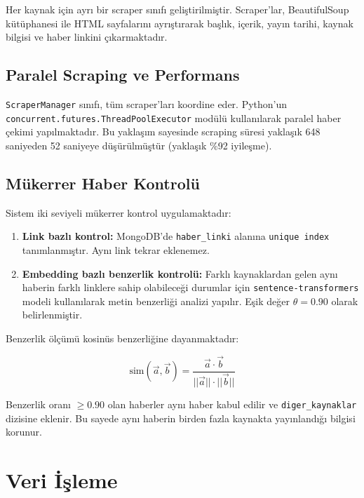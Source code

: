 \documentclass[conference]{IEEEtran}
\begin{document}
Her kaynak için ayrı bir scraper sınıfı geliştirilmiştir. Scraper'lar, BeautifulSoup kütüphanesi ile HTML sayfalarını ayrıştırarak başlık, içerik, yayın tarihi, kaynak bilgisi ve haber linkini çıkarmaktadır.

\subsection{Paralel Scraping ve Performans}

\texttt{ScraperManager} sınıfı, tüm scraper'ları koordine eder. Python'un \texttt{concurrent.futures.ThreadPoolExecutor} modülü kullanılarak paralel haber çekimi yapılmaktadır. Bu yaklaşım sayesinde scraping süresi yaklaşık 648 saniyeden 52 saniyeye düşürülmüştür (yaklaşık \%92 iyileşme).

\subsection{Mükerrer Haber Kontrolü}

Sistem iki seviyeli mükerrer kontrol uygulamaktadır:

\begin{enumerate}
    \item \textbf{Link bazlı kontrol:} MongoDB'de \texttt{haber\_linki} alanına \texttt{unique index} tanımlanmıştır. Aynı link tekrar eklenemez.
    \item \textbf{Embedding bazlı benzerlik kontrolü:} Farklı kaynaklardan gelen aynı haberin farklı linklere sahip olabileceği durumlar için \texttt{sentence-transformers} modeli kullanılarak metin benzerliği analizi yapılır. Eşik değer $\theta = 0.90$ olarak belirlenmiştir.
\end{enumerate}

Benzerlik ölçümü kosinüs benzerliğine dayanmaktadır:

\begin{equation}
    \text{sim}(\vec{a}, \vec{b}) = \frac{\vec{a} \cdot \vec{b}}{||\vec{a}|| \cdot ||\vec{b}||}
\end{equation}

Benzerlik oranı $\geq 0.90$ olan haberler aynı haber kabul edilir ve \texttt{diger\_kaynaklar} dizisine eklenir. Bu sayede aynı haberin birden fazla kaynakta yayınlandığı bilgisi korunur.

\section{Veri İşleme}
\end{document}
